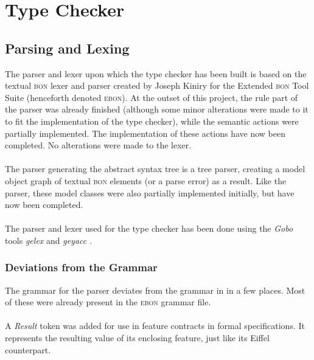 \section{Type Checker}
\subsection{Parsing and Lexing}
The parser and lexer upon which the type checker has been built is based on the textual \textsc{bon} lexer and parser created by Joseph Kiniry for the Extended \textsc{bon} Tool Suite \cite{ebon} (henceforth denoted \textsc{ebon}). At the outset of this project, the rule part of the parser was already finished (although some minor alterations were made to it to fit the implementation of the type checker), while the semantic actions were partially implemented. The implementation of these actions have now been completed. No alterations were made to the lexer.
\paragraph{} The parser generating the abstract syntax tree is a tree parser, creating a model object graph of textual \textsc{bon} elements (or a parse error) as a result. Like the parser, these model classes were also partially implemented initially, but have now been completed.


\paragraph{} The parser and lexer used for the type checker has been done using the \textit{Gobo} tools \textit{gelex} and \textit{geyacc} \cite{gobo}.
\subsubsection{Deviations from the Grammar}
The grammar for the parser deviates from the grammar in \cite{walden1995} in a few places. Most of these were already present in the \textsc{ebon} grammar file.
\paragraph{} A \textit{Result} token was added for use in feature contracts in formal specifications. It represents the resulting value of its enclosing feature, just like its Eiffel counterpart.
